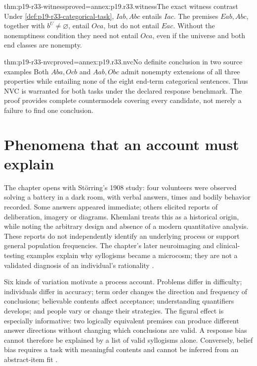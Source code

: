 \begin{hblemma}{thm:p19-r33-witness}{proved=annex:p19.r33.witness}{The exact witness contrast}
Under \cref{def:p19-r33-categorical-task}, \(Iab,Abc\) entails
\(Iac\). The premises \(Eab,Abc\), together with
\(b^U\ne\varnothing\), entail \(Oca\), but do not entail
\(Eac\). Without the nonemptiness condition they need not entail
\(Oca\), even if the universe and both end classes are nonempty.
\end{hblemma}

\begin{hblemma}{thm:p19-r33-nvc}{proved=annex:p19.r33.nvc}{No definite conclusion in two source examples}
Both \(Aba,Ocb\) and \(Aab,Obc\) admit nonempty extensions
of all three properties while entailing none of the eight end-term
categorical sentences. Thus NVC is warranted for both tasks under the
declared response benchmark. The proof provides complete countermodels
covering every candidate, not merely a failure to find one conclusion.
\end{hblemma}

\section{Phenomena that an account must explain}
\label{sec:p19-r33-phenomena}

The chapter opens with Störring's 1908 study: four volunteers were observed
solving a battery in a dark room, with verbal answers, times and bodily
behavior recorded. Some answers appeared immediate; others elicited reports
of deliberation, imagery or diagrams. Khemlani treats this as a historical
origin, while noting the arbitrary design and absence of a modern
quantitative analysis. These reports do not independently identify an
underlying process or support general population frequencies. The chapter's
later neuroimaging and clinical-testing examples explain why syllogisms
became a microcosm; they are not a validated diagnosis of an individual's
rationality \cite[pp.~225--226,233--234]{Khemlani2021Syllogistic}.

Six kinds of variation motivate a process account. Problems differ in
difficulty; individuals differ in accuracy; term order changes the
direction and frequency of conclusions; believable contents affect
acceptance; understanding quantifiers develops; and people vary or change
their strategies. The figural effect is especially informative: two
logically equivalent premises can produce different answer directions
without changing which conclusions are valid. A response bias cannot
therefore be explained by a list of valid syllogisms alone. Conversely,
belief bias requires a task with meaningful contents and cannot be inferred
from an abstract-item fit \cite[Table~3.3.1, p.~228]{Khemlani2021Syllogistic}.

